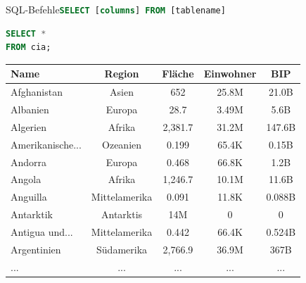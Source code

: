 \begin{frame}[fragile]{SQL-Befehle}{\lstinline[language=SQL]|SELECT [columns] FROM [tablename]|}
  \begin{lstlisting}[language=SQL, basicstyle=\ttfamily\scriptsize]
SELECT *
FROM cia;
\end{lstlisting}

  \begin{table}
    \centering
    \tiny
    \begin{tabular}{lcccc}
      \toprule
      \textbf{Name}    & \textbf{Region} & \textbf{Fläche} & \textbf{Einwohner} & \textbf{BIP} \\
      \midrule
      Afghanistan      & Asien           & 652             & 25.8M              & 21.0B        \\
      Albanien         & Europa          & 28.7            & 3.49M              & 5.6B         \\
      Algerien         & Afrika          & 2,381.7         & 31.2M              & 147.6B       \\
      Amerikanische... & Ozeanien        & 0.199           & 65.4K              & 0.15B        \\
      Andorra          & Europa          & 0.468           & 66.8K              & 1.2B         \\
      Angola           & Afrika          & 1,246.7         & 10.1M              & 11.6B        \\
      Anguilla         & Mittelamerika   & 0.091           & 11.8K              & 0.088B       \\
      Antarktik        & Antarktis       & 14M             & 0                  & 0            \\
      Antigua und...   & Mittelamerika   & 0.442           & 66.4K              & 0.524B       \\
      Argentinien      & Südamerika      & 2,766.9         & 36.9M              & 367B         \\
      \midrule
      ...              & ...             & ...             & ...                & ...          \\
      \bottomrule
    \end{tabular}
  \end{table}
\end{frame}

